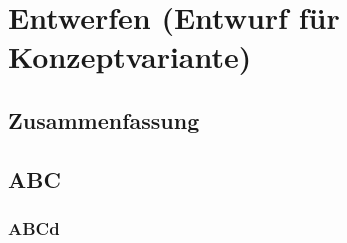 \section{Entwerfen (Entwurf für Konzeptvariante)}
\subsection{Zusammenfassung}
\subsection{ABC}
\subsubsection{ABCd}